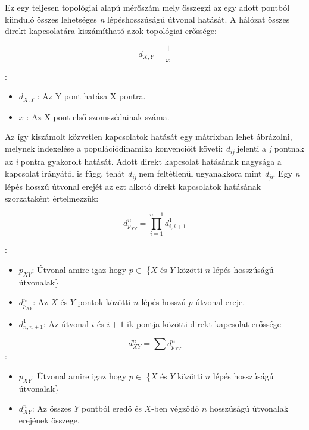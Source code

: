 \documentclass[a4paper,12pt]{article}
\begin{document}
	 Ez egy teljesen topológiai alapú mérőszám mely összegzi az egy adott pontból kiinduló összes lehetséges \textit{n} lépéshosszúságú útvonal hatását. A hálózat összes direkt kapcsolatára kiszámítható azok topológiai erőssége:
	 
	 \begin{equation}
		d_{X,Y} = \frac{1}{x}
	 \end{equation}
	 
 	 :
 	 \begin{itemize}[label=]
		 \item $d_{X,Y}$ : Az Y pont hatása X pontra.
		 \item $x$ : Az X pont első szomszédainak száma.
 	 \end{itemize}
	 
	 Az így kiszámolt közvetlen kapcsolatok hatását egy mátrixban lehet ábrázolni, melynek indexelése a populációdinamika konvencióit követi: \textit{d}\textsubscript{\textit{ij}} jelenti a \textit{j} pontnak az \textit{i} pontra gyakorolt hatását. Adott direkt kapcsolat hatásának nagysága a kapcsolat irányától is függ, tehát \textit{d}\textsubscript{\textit{ij}} nem feltétlenül ugyanakkora mint \textit{d}\textsubscript{\textit{ji}}. Egy \textit{n} lépés hosszú útvonal erejét az ezt alkotó direkt kapcsolatok hatásának szorzataként értelmezzük:
	 
	 \begin{equation}
		d^n_{p_{XY}} =\prod_{i=1}^{n-1} d^1_{i, i+1} 
	 \end{equation}
	 
	 
	 :
	 \begin{itemize}[label=]
		 \item $p_{XY}$: Útvonal amire igaz hogy $p \in$ \{$X$ és $Y$ közötti $n$ lépés hosszúságú útvonalak\}
		 \item $d^n_{p_{XY}}$: Az $X$ és $Y$ pontok közötti $n$ lépés hosszú $p$ útvonal ereje.
		 \item $d^1_{n, n+1}$: Az útvonal $i$ és $i+1$-ik pontja közötti direkt kapcsolat erőssége
	 \end{itemize}
	 
	 
	 \begin{equation}
		 d^n_{XY} = \sum d^{n}_{p_{XY}}
	 \end{equation}
	 :
	 \begin{itemize}[label=]
		\item $p_{XY}$: Útvonal amire igaz hogy $p \in$ \{$X$ és $Y$ közötti $n$ lépés hosszúságú útvonalak\}
		\item $d^n_{XY}$: Az összes $Y$ pontból eredő és $X$-ben végződő $n$ hosszúságú útvonalak erejének összege. 
	 \end{itemize}	 
	 
\end{document}
